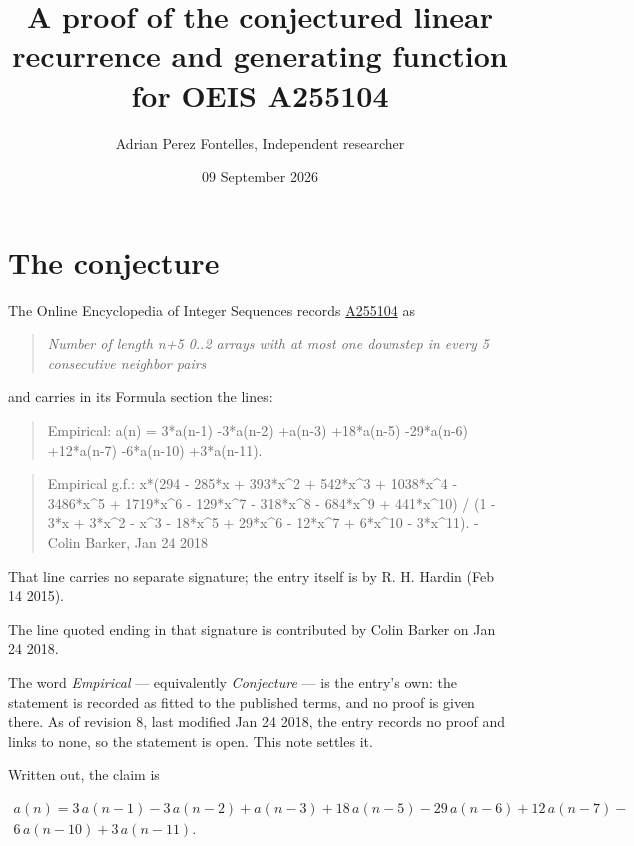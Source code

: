 \documentclass[11pt]{article}
\title{A proof of the conjectured linear recurrence and generating function for OEIS A255104}
\author{Adrian Perez Fontelles, Independent researcher}
\date{09 September 2026}
\theoremstyle{definition}
\begin{document}
\maketitle
\section{The conjecture}

The Online Encyclopedia of Integer Sequences records \href{https://oeis.org/A255104}{A255104} as

\begin{quote}\itshape Number of length n+5 0..2 arrays with at most one downstep in every 5 consecutive neighbor pairs\end{quote}

and carries in its Formula section the lines:

\begin{quote}\ttfamily Empirical: a(n) = 3*a(n-1) -3*a(n-2) +a(n-3) +18*a(n-5) -29*a(n-6) +12*a(n-7) -6*a(n-10) +3*a(n-11).\end{quote}

\begin{quote}\ttfamily Empirical g.f.: x*(294 - 285*x + 393*x\textasciicircum{}2 + 542*x\textasciicircum{}3 + 1038*x\textasciicircum{}4 - 3486*x\textasciicircum{}5 + 1719*x\textasciicircum{}6 - 129*x\textasciicircum{}7 - 318*x\textasciicircum{}8 - 684*x\textasciicircum{}9 + 441*x\textasciicircum{}10) / (1 - 3*x + 3*x\textasciicircum{}2 - x\textasciicircum{}3 - 18*x\textasciicircum{}5 + 29*x\textasciicircum{}6 - 12*x\textasciicircum{}7 + 6*x\textasciicircum{}10 - 3*x\textasciicircum{}11). - Colin Barker, Jan 24 2018\end{quote}

That line carries no separate signature; the entry itself is by R. H. Hardin (Feb 14 2015).

The line quoted ending in that signature is contributed by Colin Barker on Jan 24 2018.

The word {\itshape Empirical} --- equivalently {\itshape Conjecture} --- is the entry's own: the statement is recorded as fitted to the published terms, and no proof is given there. As of revision 8, last modified Jan 24 2018, the entry records no proof and links to none, so the statement is open. This note settles it.

Written out, the claim is

\begin{multline*} a(n) = 3\,a(n-1) - 3\,a(n-2) + a(n-3) + 18\,a(n-5) - 29\,a(n-6) + 12\,a(n-7) - \\ 6\,a(n-10) + 3\,a(n-11). \end{multline*}
\end{document}
